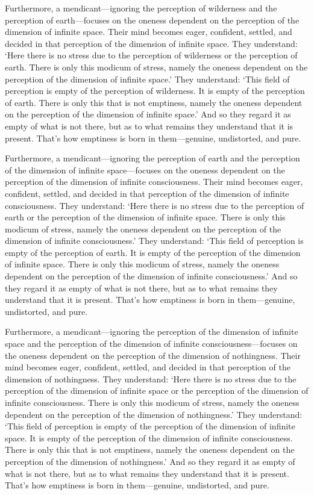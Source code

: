 \documentclass[12pt,openany]{book}%
\begin{document}
Furthermore, a mendicant—ignoring the perception of wilderness and the perception of earth—focuses on the oneness dependent on the perception of the dimension of infinite space. Their mind becomes eager, confident, settled, and decided in that perception of the dimension of infinite space. They understand: ‘Here there is no stress due to the perception of wilderness or the perception of earth. There is only this modicum of stress, namely the oneness dependent on the perception of the dimension of infinite space.’ They understand: ‘This field of perception is empty of the perception of wilderness. It is empty of the perception of earth. There is only this that is not emptiness, namely the oneness dependent on the perception of the dimension of infinite space.’ And so they regard it as empty of what is not there, but as to what remains they understand that it is present. That’s how emptiness is born in them—genuine, undistorted, and pure. 

Furthermore, a mendicant—ignoring the perception of earth and the perception of the dimension of infinite space—focuses on the oneness dependent on the perception of the dimension of infinite consciousness. Their mind becomes eager, confident, settled, and decided in that perception of the dimension of infinite consciousness. They understand: ‘Here there is no stress due to the perception of earth or the perception of the dimension of infinite space. There is only this modicum of stress, namely the oneness dependent on the perception of the dimension of infinite consciousness.’ They understand: ‘This field of perception is empty of the perception of earth. It is empty of the perception of the dimension of infinite space. There is only this modicum of stress, namely the oneness dependent on the perception of the dimension of infinite consciousness.’ And so they regard it as empty of what is not there, but as to what remains they understand that it is present. That’s how emptiness is born in them—genuine, undistorted, and pure. 

Furthermore, a mendicant—ignoring the perception of the dimension of infinite space and the perception of the dimension of infinite consciousness—focuses on the oneness dependent on the perception of the dimension of nothingness. Their mind becomes eager, confident, settled, and decided in that perception of the dimension of nothingness. They understand: ‘Here there is no stress due to the perception of the dimension of infinite space or the perception of the dimension of infinite consciousness. There is only this modicum of stress, namely the oneness dependent on the perception of the dimension of nothingness.’ They understand: ‘This field of perception is empty of the perception of the dimension of infinite space. It is empty of the perception of the dimension of infinite consciousness. There is only this that is not emptiness, namely the oneness dependent on the perception of the dimension of nothingness.’ And so they regard it as empty of what is not there, but as to what remains they understand that it is present. That’s how emptiness is born in them—genuine, undistorted, and pure. 
\end{document}
